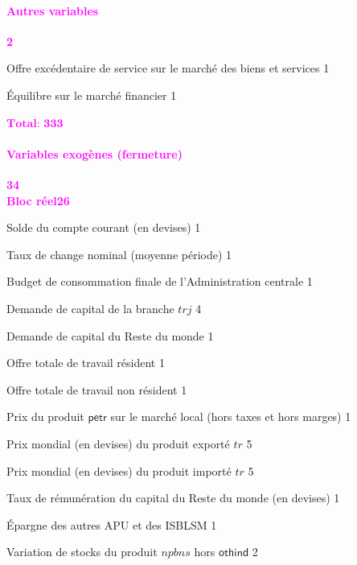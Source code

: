 \documentclass[11pt,a4paper]{article}
\newcommand{\npbns}{\mathit{npbns}}
\newcommand{\othind}{\mathsf{othind}}
\newcommand{\petr}{\mathsf{petr}}
\newcommand{\tr}{\mathit{tr}}
\newcommand{\trj}{\mathit{trj}}
\newcommand{\CAB}{\mathit{CAB}}
\newcommand{\CTG}{\mathit{CTG}}
\newcommand{\KD}{\mathit{KD}}
\newcommand{\LEON}{\mathit{LEON}}
\newcommand{\LEONF}{\mathit{LEONF}}
\newcommand{\LS}{\mathit{LS}}
\newcommand{\PL}{\mathit{PL}}
\newcommand{\PWE}{\mathit{PWE}}
\newcommand{\PWM}{\mathit{PWM}}
\newcommand{\SNG}{\mathit{SNG}}
\newcommand{\VSTK}{\mathit{VSTK}}
\newcommand{\redparagraph}[1]{\paragraph*{\large\textcolor{Fuchsia}{#1}}}
\begin{document}
	\redparagraph{Autres variables}\hfill \textcolor{Fuchsia}{\textbf{2}} 
	\begin{description}[leftmargin=!,labelwidth=\widthof{\bfseries AAAAAAA}]
		\item[$\LEON$]  Offre excédentaire de service sur le marché des biens et services \hfill 1
		
		\item[$\LEONF$] Équilibre sur le marché financier \hfill 1
		
		\hfill \textcolor{Fuchsia}{$\overline{\textbf{Total: 333}}$}
	\end{description}
	\redparagraph{Variables exogènes (fermeture)}\hfill \textcolor{Fuchsia}{\textbf{34}}\\
	\textcolor{Fuchsia}{\textbf{Bloc réel}}\hfill \textcolor{Fuchsia}{\textbf{26}}
	\begin{description}[leftmargin=!,labelwidth=\widthof{\bfseries AAAAAAAA},parsep=9.7pt]	
		\item[$\CAB$]			Solde du compte courant  (en devises)			\hfill 1
		\item[$e$]				Taux de change nominal (moyenne période)				\hfill 1
		\item[$\CTG$]			Budget de consommation finale de l'Administration centrale	\hfill 1
		\item[$\KD_{\trj}$]		Demande de capital de la branche $\trj$ 		\hfill 4
		\item[$\KD^R$]			Demande de capital du Reste du monde 	\hfill 1
		\item[$\LS$]			Offre totale de travail résident 	\hfill 1
				\item[$\LS^R$]			Offre totale de travail non résident 	\hfill 1
		\item[$\PL_{\petr}$]	Prix du produit $\petr$ sur le marché local (hors taxes et hors marges)	\hfill 1
		\item[$\PWE_{\tr}$]		Prix mondial (en devises) du produit exporté $\tr$ 		\hfill 5
		\item[$\PWM_{\tr}$]		Prix mondial (en devises) du produit importé $\tr$ 		\hfill 5
		\item[$R^R$]			Taux de rémunération du capital du Reste du monde (en devises) 	\hfill 1
		\item[$\SNG$]			Épargne des autres APU et des ISBLSM 	\hfill 1
		\item[$\VSTK_{\underset{\neq \othind}{\npbns}}$]	Variation de stocks du produit $\npbns$ hors $\othind$	\hfill 2
	\end{description}
	
\end{document}
